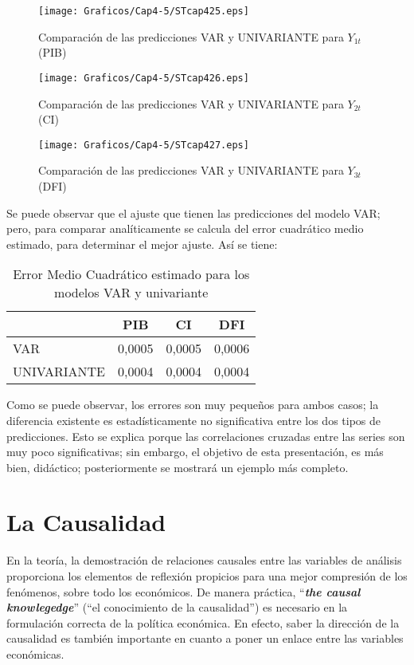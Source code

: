 \begin{figure}[H]
\centering
\texttt{[image: Graficos/Cap4-5/STcap425.eps]}
\caption{Comparaci\'{o}n de las predicciones VAR y UNIVARIANTE para $Y_{1t}$ (PIB)}
\label{fig25}
\end{figure}

\begin{figure}[H]
\centering
\texttt{[image: Graficos/Cap4-5/STcap426.eps]}
\caption{Comparaci\'{o}n de las predicciones VAR y UNIVARIANTE para $Y_{2t}$ (CI) }
\label{fig26}
\end{figure}

\begin{figure}[H]
\centering
\texttt{[image: Graficos/Cap4-5/STcap427.eps]}
\caption{Comparaci\'{o}n de las predicciones VAR y UNIVARIANTE para $Y_{3t}$ (DFI)}
\label{fig27}
\end{figure}

Se puede observar que el ajuste que tienen las predicciones del modelo VAR; pero, para comparar anal\'{i}ticamente se calcula del error cuadr\'{a}tico medio estimado, para determinar el mejor ajuste. As\'{i} se tiene:

\begin{table}[H]
\centering
\begin{tabular}{|l|c|c|c|}\hline
~& PIB & CI & DFI \\ \hline
VAR & 0,0005 & 0,0005 & 0,0006 \\ \hline
UNIVARIANTE & 0,0004 & 0,0004 & 0,0004 \\\hline
\end{tabular}
\caption{Error Medio Cuadr\'{a}tico estimado para los modelos VAR y univariante}
\label{tab22}
\end{table}

Como se puede observar, los errores son muy peque\~{n}os para ambos casos; la diferencia existente es estad\'{i}sticamente no significativa entre los dos tipos de predicciones. Esto se explica porque las correlaciones cruzadas entre las series son muy poco significativas; sin embargo, el objetivo de esta presentaci\'{o}n, es m\'{a}s bien, did\'{a}ctico; posteriormente se mostrar\'{a} un ejemplo m\'{a}s completo.

\section{La Causalidad}
\label{subsec:mylabel9}

En la teor\'{i}a, la demostraci\'{o}n de relaciones causales entre las variables de an\'{a}lisis proporciona los elementos de reflexi\'{o}n propicios para una mejor compresi\'{o}n de los fen\'{o}menos, sobre todo los econ\'{o}micos. De manera pr\'{a}ctica, ``\textbf{\textit{the causal knowlegedge}}'' (``el conocimiento de la causalidad'') es 
necesario en la formulaci\'{o}n correcta de la pol\'{i}tica econ\'{o}mica. En efecto, saber la direcci\'{o}n de la causalidad es tambi\'{e}n importante en cuanto a poner un enlace entre las variables econ\'{o}micas.

